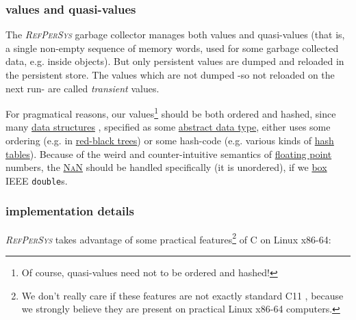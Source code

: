 \documentclass[11pt,a4paper,svgnames]{article}
\newcommand{\RefPerSys}{{\textit{\textsc{RefPerSys}}}}
\begin{document}
\medskip

\subsubsection{values and quasi-values}
\label{subsubsec:values-quasi}

The {\RefPerSys} garbage collector manages both values and
quasi-values (that is, a single non-empty sequence of memory words,
used for some garbage collected data, e.g. inside objects). But only
persistent values are dumped and reloaded in the persistent store.
The values which are not dumped -so not reloaded on the next run- are
called \emph{transient} values.

  For pragmatical reasons, our values\footnote{Of course, quasi-values
  need not to be ordered and hashed!} should be both ordered and
  hashed, since many
  \href{https://en.wikipedia.org/wiki/Data\_structure}{data
    structures} \cite{cormen:2009:introduction}, specified as some
  \href{https://en.wikipedia.org/wiki/Abstract_data_type}{abstract
    data type}, either uses some ordering (e.g. in
  \href{https://en.wikipedia.org/wiki/Red-black_tree}{red-black
    trees}) or some hash-code (e.g. various kinds of
  \href{https://en.wikipedia.org/wiki/Hash_table}{hash
    tables}). Because of the weird and counter-intuitive semantics of
  \href{http://floating-point-gui.de}{floating point} numbers, the
  \href{https://en.wikipedia.org/wiki/NaN}{\textsc{NaN}} should be
  handled specifically (it is unordered), if we
  \href{https://en.wikipedia.org/wiki/Object\_type\_(object-oriented\_programming)\#Boxing}{box}
  IEEE \texttt{double}s.


  
  \medskip

\subsubsection{implementation details}
\label{subsubsec:implementation-details}

{\RefPerSys} takes advantage of some practical features\footnote{We
don't really care if these features are not exactly standard C11
\cite{c11-standard:2011}, because we strongly believe they are present
on practical Linux x86-64 computers.} of C on Linux x86-64:
\end{document}

